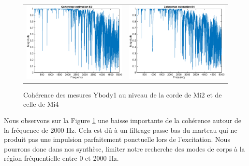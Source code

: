 \begin{figure}[h]
\centering
\begin{tabular}{cc}
   \includegraphics[width = 7cm]{figures/coherence_Z_1_E2.eps} &
   \includegraphics[width = 7cm]{figures/coherence_Z_1_E4.eps} \\
\end{tabular}
\caption{Cohérence des mesures Ybody1 au niveau de la corde de Mi2 et de celle de Mi4}
\label{fig:gall}
\end{figure}
Nous observons sur la Figure \ref{fig:gall} une baisse importante de la cohérence autour de la fréquence de 2000 Hz. Cela est dû à un filtrage passe-bas du marteau qui ne produit pas une impulsion parfaitement ponctuelle lors de l'excitation. Nous pourrons donc dans nos synthèse, limiter notre recherche des modes de corps à la région fréquentielle entre 0 et 2000 Hz.
